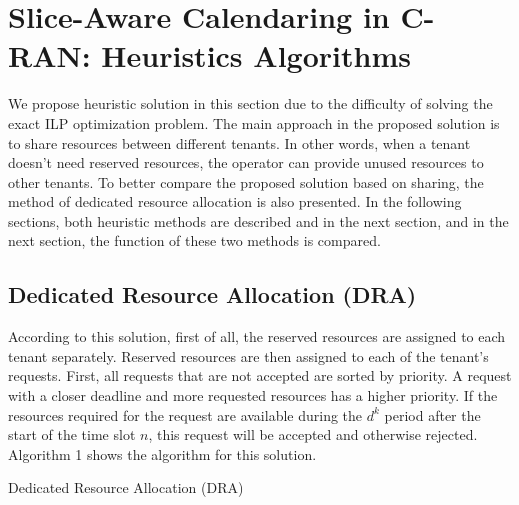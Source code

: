 \documentclass[conference]{IEEEtran}
\begin{document}
\section{Slice-Aware Calendaring in C-RAN: Heuristics Algorithms}
We propose heuristic solution in this section due to the difficulty of solving the exact ILP optimization problem. The main approach in the proposed solution is to share resources between different tenants. In other words, when a tenant doesn't need reserved resources, the operator can provide unused resources to other tenants. To better compare the proposed solution based on sharing, the method of dedicated resource allocation is also presented. In the following sections, both heuristic methods are described and in the next section, and in the next section, the function of these two methods is compared.

\subsection{Dedicated Resource Allocation (DRA)}\label{AA}
According to this solution, first of all, the reserved resources are assigned to each tenant separately. Reserved resources are then assigned to each of the tenant's requests. First, all requests that are not accepted are sorted by priority. A request with a closer deadline and more requested resources has a higher priority. If the resources required for the request are available during the $d^k$ period after the start of the time slot $n$, this request will be accepted and otherwise rejected. Algorithm 1 shows the algorithm for this solution.

\begin{algorithm}
\caption{Dedicated Resource Allocation (DRA)}
\end{algorithm}
\end{document}
